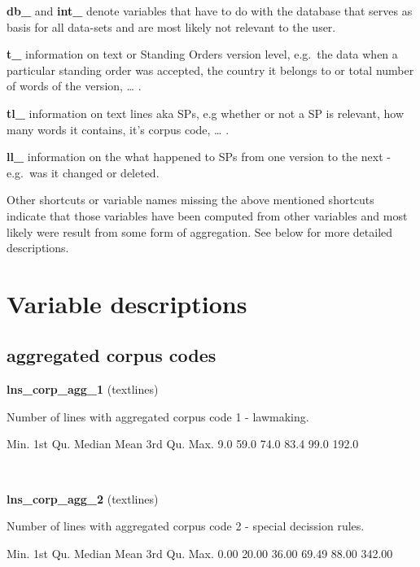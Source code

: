 \documentclass[]{article}
\newenvironment{Shaded}{\begin{snugshade}}{\end{snugshade}}
\newcommand{\FloatTok}[1]{\textcolor[rgb]{0.00,0.00,0.81}{{#1}}}
\newcommand{\NormalTok}[1]{{#1}}
\begin{document}
\textbf{db\_} and \textbf{int\_} denote variables that have to do with
the database that serves as basis for all data-sets and are most likely
not relevant to the user.

\textbf{t\_} information on text or Standing Orders version level,
e.g.~the data when a particular standing order was accepted, the country
it belongs to or total number of words of the version, \ldots{} .

\textbf{tl\_} information on text lines aka SPs, e.g whether or not a SP
is relevant, how many words it contains, it's corpus code, \ldots{} .

\textbf{ll\_} information on the what happened to SPs from one version
to the next - e.g.~was it changed or deleted.

Other shortcuts or variable names missing the above mentioned shortcuts
indicate that those variables have been computed from other variables
and most likely were result from some form of aggregation. See below for
more detailed descriptions.

\section{Variable descriptions}\label{variable-descriptions}

\subsection{aggregated corpus codes}\label{aggregated-corpus-codes}

\textbf{lns\_corp\_agg\_1} (textlines)

Number of lines with aggregated corpus code 1 - lawmaking.

\begin{Shaded}
\begin{Highlighting}[]
   \NormalTok{Min. 1st Qu.  Median    Mean 3rd Qu.    Max. }
    \FloatTok{9.0}    \FloatTok{59.0}    \FloatTok{74.0}    \FloatTok{83.4}    \FloatTok{99.0}   \FloatTok{192.0} 
\end{Highlighting}
\end{Shaded}

~

\vspace{1em}

\textbf{lns\_corp\_agg\_2} (textlines)

Number of lines with aggregated corpus code 2 - special decission rules.

\begin{Shaded}
\begin{Highlighting}[]
   \NormalTok{Min. 1st Qu.  Median    Mean 3rd Qu.    Max. }
   \FloatTok{0.00}   \FloatTok{20.00}   \FloatTok{36.00}   \FloatTok{69.49}   \FloatTok{88.00}  \FloatTok{342.00} 
\end{Highlighting}
\end{Shaded}
\end{document}
